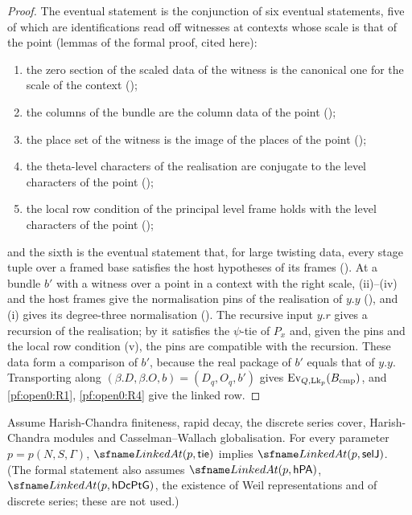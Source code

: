 \begin{proof}
The eventual statement is the conjunction of six eventual statements, five of which are identifications read off
witnesses at contexts whose scale is that of the point (lemmas of the formal proof, cited here):
\begin{enumerate}[label=(\roman*)]
\item the zero section of the scaled data of the witness is the canonical one for the scale of the context
();
\item the columns of the bundle are the column data of the point ();
\item the place set of the witness is the image of the places of the point
();
\item the theta-level characters of the realisation are conjugate to the level characters of the point
();
\item the local row condition of the principal level frame holds with the level characters of the point
();
\end{enumerate}
and the sixth is the eventual statement that, for large twisting data, every stage tuple over a framed base satisfies the
host hypotheses of its frames (). At a bundle $b'$ with a
witness over a point in a context with the right scale, (ii)--(iv) and the host frames give the normalisation pins of the
realisation of $y.y$ (), and (i) gives its degree-three normalisation
(). The recursive input $y.r$ gives a recursion of the realisation;
by  it satisfies the $\psi$-tie of $P_x$ and, given the pins and
the local row condition (v), the pins are compatible with the recursion. These data form a comparison of $b'$, because
the real package of $b'$ equals that of $y.y$. Transporting along $(\beta.D,\beta.O,b)=(D_q,O_q,b')$ gives
$\mathrm{Ev}_{Q,\mathrm{Lk}_p}(B_{\mathrm{cmp}})$, and \ref{pf:open0:R1}, \ref{pf:open0:R4} give the linked row.
\end{proof}

\begin{proposition}[Joins]\label{pf:open0:selj}
Assume Harish-Chandra finiteness, rapid decay, the discrete series cover, Harish-Chandra modules and Casselman--Wallach
globalisation. For every parameter $p=p(N,S,\Gamma)$, $\openzeroLinked(p,\mathsf{tie})$ implies $\openzeroLinked(p,\mathsf{selJ})$.
(The formal statement also assumes $\openzeroLinked(p,\mathsf{hPA})$, $\openzeroLinked(p,\mathsf{hDcPtG})$, the existence of
Weil representations and of discrete series; these are not used.)
\ \
\ 
\end{proposition}

